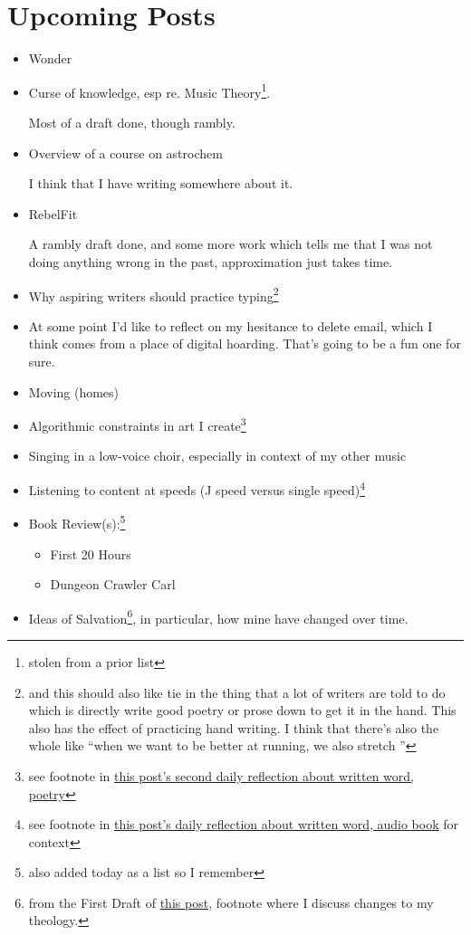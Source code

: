 \documentclass[12pt]{article}
\newcommand{\say}[1]{``#1''}
\renewcommand{\,}{\textsuperscript{,}}
\begin{document}
\section{Upcoming Posts}  
\begin{itemize}

\item Wonder  
\item Curse of knowledge, esp re. Music Theory\footnote{stolen from a prior list}.

Most of a draft done, though rambly.  
\item Overview of a course on astrochem

I think that I have writing somewhere about it.  
\item RebelFit

A rambly draft done, and some more work which tells me that I was not doing anything wrong in the past, approximation just takes time.  
\item Why aspiring writers should practice typing\footnote{and this should also like tie in the thing that a lot of writers are told to do which is directly write good poetry or prose down to get it in the hand. This also has the effect of practicing hand writing. I think that there's also the whole like \say{when we want to be better at running, we also stretch }}

\item At some point I'd like to reflect on my hesitance to delete email, which I think comes from a place of digital hoarding. That's going to be a fun one for sure.

\item Moving (homes)

\item Algorithmic constraints in art I create\footnote{see footnote in \href{reflection-june-2026}{this post's second daily reflection about written word, poetry}}

\item Singing in a low-voice choir, especially in context of my other music

\item Listening to content at speeds (J speed versus single speed)\footnote{see footnote in \href{reflection-2}{this post's daily reflection about written word, audio book} for context}

\item Book Review(s):\footnote{also added today as a list so I remember}

\begin{itemize}

\item First 20 Hours

\item Dungeon Crawler Carl

\end{itemize}

\item Ideas of Salvation\footnote{from the First Draft of \href{reflection-2}{this post}, footnote where I discuss changes to my theology.}, in particular, how mine have changed over time.

\end{itemize}
\end{document}
